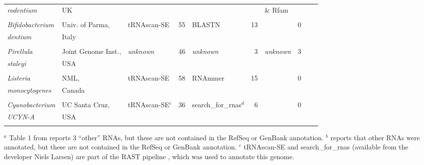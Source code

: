 \begin{footnotesize}
\begin{table}
\begin{tabular}{ll|ll|lr|lr|lr}
\emph{rodentium} \citep{Petty10}          & UK                &             &    &                &    & \& Rfam  &    \\ 
& & & & & & & & \\
\emph{Bifidobacterium}                   & Univ. of Parma,   & tRNAscan-SE & 55 & BLASTN & 13 &       &        0 \\
\emph{dentium} \citep{Ventura09}          & Italy             &             &    &        &    &       &        \\ 
& & & & & & & & \\
\emph{Pirellula}                         & Joint Genome Inst.,&\emph{unknown}&46&\emph{unknown}&  3   & \emph{unknown} & 3 \\
\emph{staleyi} \citep{Clum09}             & USA               &             &    &        &            &          &     & \\  %
& & & & & & & & \\
\emph{Listeria}                          & NML,              & tRNAscan-SE & 58 &RNAmmer & 15 &       &          0 \\
\emph{monocytogenes} \citep{Gilmour10}    & Canada            &             &    &    &        &       &             \\ 
& & & & & & & & \\
\emph{Cyanobacterium}                    & UC Santa Cruz,    & tRNAscan-SE$^c$ & 36 & search\_for\_rnas$^d$ & 6  &     & 0    \\
\emph{UCYN-A} \citep{Tripp10}             & USA               &             &    &             &       &          &     & \\ 
& & & & & & & & \\ \hline
\end{tabular}

$^a$ Table 1 from \citep{Leahy10} reports 3 ``other'' RNAs, but these are not contained in the RefSeq or GenBank annotation.
$^b$ \citep{Hartman10} reports that other RNAs were annotated, but these are not contained in the RefSeq or GenBank annotation.
$^c$ tRNAscan-SE and search\_for\_rnas (available from the developer
Niels Larsen) are part of the RAST pipeline \citep{Aziz08}, which was used to annotate this genome.
\end{table}
\end{footnotesize}

